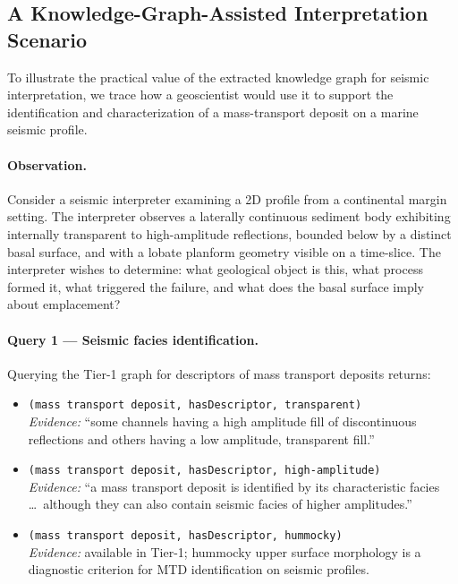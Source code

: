 \documentclass[10pt]{article}
\begin{document}
\subsection{A Knowledge-Graph-Assisted Interpretation
Scenario}
\label{sec:vignette}

To illustrate the practical value of the extracted
knowledge graph for seismic interpretation, we trace
how a geoscientist would use it to support the
identification and characterization of a
mass-transport deposit on a marine seismic profile.

\paragraph{Observation.}
Consider a seismic interpreter examining a 2D profile
from a continental margin setting.
The interpreter observes a laterally continuous
sediment body exhibiting internally transparent to
high-amplitude reflections, bounded below by a
distinct basal surface, and with a lobate planform
geometry visible on a time-slice.
The interpreter wishes to determine: what geological
object is this, what process formed it, what
triggered the failure, and what does the basal
surface imply about emplacement?

\paragraph{Query 1 — Seismic facies identification.}
Querying the Tier-1 graph for descriptors of mass
transport deposits returns:

\begin{itemize}
  \item \texttt{(mass transport deposit,
  hasDescriptor, transparent)}\\
  \textit{Evidence:} ``some channels having a high
  amplitude fill of discontinuous reflections and
  others having a low amplitude, transparent fill.''

  \item \texttt{(mass transport deposit,
  hasDescriptor, high-amplitude)}\\
  \textit{Evidence:} ``a mass transport deposit is
  identified by its characteristic facies \ldots\
  although they can also contain seismic facies of
  higher amplitudes.''

  \item \texttt{(mass transport deposit,
  hasDescriptor, hummocky)}\\
  \textit{Evidence:} available in Tier-1; hummocky
  upper surface morphology is a diagnostic criterion
  for MTD identification on seismic profiles.
\end{itemize}
\end{document}

